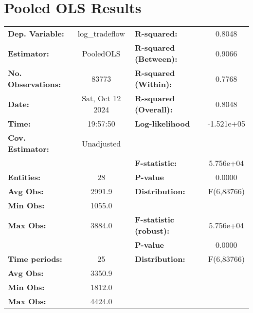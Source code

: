 \documentclass{article}
\begin{document}
\section*{Pooled OLS Results}
\begin{center}
\begin{tabular}{lclc}
\toprule
\textbf{Dep. Variable:}    &   log\_tradeflow   & \textbf{  R-squared:         }   &      0.8048      \\
\textbf{Estimator:}        &     PooledOLS      & \textbf{  R-squared (Between):}  &      0.9066      \\
\textbf{No. Observations:} &       83773        & \textbf{  R-squared (Within):}   &      0.7768      \\
\textbf{Date:}             &  Sat, Oct 12 2024  & \textbf{  R-squared (Overall):}  &      0.8048      \\
\textbf{Time:}             &      19:57:50      & \textbf{  Log-likelihood     }   &    -1.521e+05    \\
\textbf{Cov. Estimator:}   &     Unadjusted     & \textbf{                     }   &                  \\
\textbf{}                  &                    & \textbf{  F-statistic:       }   &    5.756e+04     \\
\textbf{Entities:}         &         28         & \textbf{  P-value            }   &      0.0000      \\
\textbf{Avg Obs:}          &       2991.9       & \textbf{  Distribution:      }   &    F(6,83766)    \\
\textbf{Min Obs:}          &       1055.0       & \textbf{                     }   &                  \\
\textbf{Max Obs:}          &       3884.0       & \textbf{  F-statistic (robust):} &    5.756e+04     \\
\textbf{}                  &                    & \textbf{  P-value            }   &      0.0000      \\
\textbf{Time periods:}     &         25         & \textbf{  Distribution:      }   &    F(6,83766)    \\
\textbf{Avg Obs:}          &       3350.9       & \textbf{                     }   &                  \\
\textbf{Min Obs:}          &       1812.0       & \textbf{                     }   &                  \\
\textbf{Max Obs:}          &       4424.0       & \textbf{                     }   &                  \\

\end{tabular}
\end{center}
\end{document}
